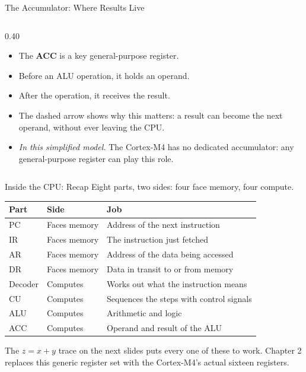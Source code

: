 \documentclass[9pt,aspectratio=169,xcolor=table]{beamer}
\newcommand{\striped}{\rowcolors{1}{white}{stripe}}
\begin{document}
\begin{frame}{The Accumulator: Where Results Live}
\begin{columns}[c, onlytextwidth]
		\begin{column}{0.40\textwidth}
			\small
			\begin{itemize}
				\setlength{\itemsep}{0.6em}
				\item The \textbf{ACC} is a key general-purpose register.
				\item \alert{Before} an ALU operation, it holds an operand.
				\item \alert{After} the operation, it receives the result.
				\item The dashed arrow shows why this matters: a result can become
				the next operand, without ever leaving the CPU.
				\item \emph{In this simplified model.} The Cortex-M4 has no dedicated
				accumulator: any general-purpose register can play this role.
			\end{itemize}
		\end{column}

	\end{columns}
\end{frame}

\begin{frame}{Inside the CPU: Recap}
    \leavevmode
    {\small Eight parts, two sides: four \alert{face memory}, four \alert{compute}.}

    \vspace{2mm}
    \begin{center}
    {\small
    \striped
    \begin{tabular}{@{}l l l@{}}
        \toprule
        \textbf{Part} & \textbf{Side} & \textbf{Job} \\
        \midrule
        PC & Faces memory & Address of the next instruction \\
        IR & Faces memory & The instruction just fetched \\
        AR & Faces memory & Address of the data being accessed \\
        DR & Faces memory & Data in transit to or from memory \\
        Decoder & Computes & Works out what the instruction means \\
        CU & Computes & Sequences the steps with control signals \\
        ALU & Computes & Arithmetic and logic \\
        ACC & Computes & Operand and result of the ALU \\
        \bottomrule
    \end{tabular}}
    \end{center}

    \vspace{2mm}
    {\small The $z = x + y$ trace on the next slides puts every one of these to work. Chapter 2 replaces this generic register set with the Cortex-M4's actual sixteen registers.}
\end{frame}
\end{document}
